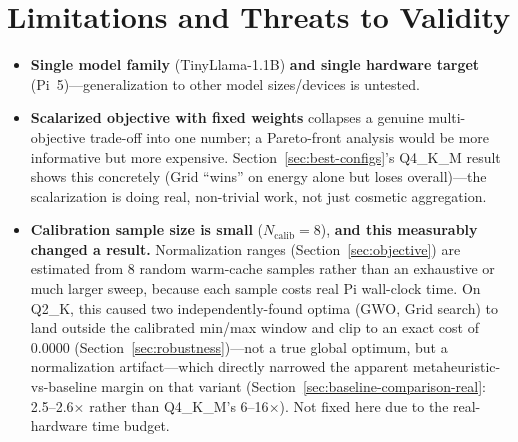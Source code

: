 \documentclass[journal]{IEEEtran}
\begin{document}
\section{Limitations and Threats to Validity}
\label{sec:limitations}

\begin{itemize}
  \item \textbf{Single model family} (TinyLlama-1.1B) \textbf{and single hardware target} (Pi~5)---generalization to other model sizes/devices is untested.
  \item \textbf{Scalarized objective with fixed weights} collapses a genuine multi-objective trade-off into one number; a Pareto-front analysis would be more informative but more expensive. Section~\ref{sec:best-configs}'s Q4\_K\_M result shows this concretely (Grid ``wins'' on energy alone but loses overall)---the scalarization is doing real, non-trivial work, not just cosmetic aggregation.
  \item \textbf{Calibration sample size is small} ($N_{\text{calib}}=8$), \textbf{and this measurably changed a result.} Normalization ranges (Section~\ref{sec:objective}) are estimated from 8 random warm-cache samples rather than an exhaustive or much larger sweep, because each sample costs real Pi wall-clock time. On Q2\_K, this caused two independently-found optima (GWO, Grid search) to land outside the calibrated min/max window and clip to an exact cost of 0.0000 (Section~\ref{sec:robustness})---not a true global optimum, but a normalization artifact---which directly narrowed the apparent metaheuristic-vs-baseline margin on that variant (Section~\ref{sec:baseline-comparison-real}: 2.5--2.6$\times$ rather than Q4\_K\_M's 6--16$\times$). Not fixed here due to the real-hardware time budget.

\end{itemize}
\end{document}
